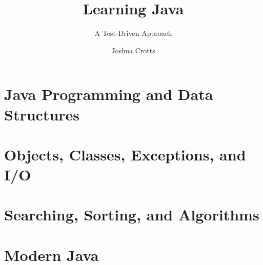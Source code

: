 \documentclass[graybox,envcountchap,sectrefs]{style/svmono}
\begin{document}
\author{Joshua Crotts}
\title{Learning Java}
\subtitle{A Test-Driven Approach}
\maketitle

\frontmatter%





\tableofcontents


\mainmatter%
\part{Java Programming and Data Structures}



\part{Objects, Classes, Exceptions, and I/O}


\part{Searching, Sorting, and Algorithms}


\part{Modern Java}




\backmatter%





\printindex

\end{document}
